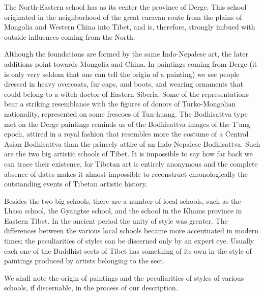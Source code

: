 \documentclass[a4paper, 12pt, oneside]{article}
\begin{document}
The North-Eastern school has as its center the province of Derge. This school originated in the neighborhood of the great caravan route from the plains of Mongolia and Western China into Tibet, and is, therefore, strongly imbued with outside influences coming from the North.

Although the foundations are formed by the same Indo-Nepalese art, the later additions point towards Mongolia and China. In paintings coming from Derge (it is only very seldom that one can tell the origin of a painting) we see people dressed in heavy overcoats, fur caps, and boots, and wearing ornaments that could belong to a witch doctor of Eastern Siberia. Some of the representations bear a striking resemblance with the figures of donors of Turko-Mongolian nationality, represented on some frescoes of Tun-huang. The Bodhisattva type met on the Derge paintings reminds us of the Bodhisattva images of the T'ang epoch, attired in a royal fashion that resembles more the costume of a Central Asian Bodhisattva than the princely attire of an Indo-Nepalese Bodhisattva. Such are the two big artistic schools of Tibet. It is impossible to say how far back we can trace their existence, for Tibetan art is entirely anonymous and the complete absence of dates makes it almost impossible to reconstruct chronologically the outstanding events of Tibetan artistic history.

Besides the two big schools, there are a number of local schools, such as the Lhasa school, the Gyangtse school, and the school in the Khams province in Eastern Tibet. In the ancient period the unity of style was greater. The differences between the various local schools became more accentuated in modern times; the peculiarities of styles can be discerned only by an expert eye. Usually each one of the Buddhist sects of Tibet has something of its own in the style of paintings produced by artists belonging to the sect.

We shall note the origin of paintings and the peculiarities of styles of various schools, if discernable, in the process of our description.
\end{document}
